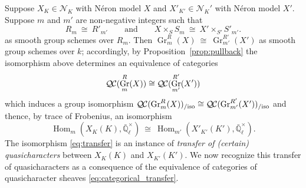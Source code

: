 \documentclass{amsart}
\theoremstyle{plain}
\theoremstyle{definition}
\theoremstyle{remark}
\newcommand{\EE}{\mathbb{\bar Q}_\ell}
\newcommand{\Fq}{k}
\newcommand{\EEx}{\EE^\times}
\DeclareMathOperator{\Hom}{Hom}
\DeclareMathOperator{\Gr}{Gr}
\newcommand{\iso}{{\ \cong\ }}
\newcommand{\QC}{{\mathcal{Q\hskip-0.8pt C}}}
\newcommand{\QCiso}[1]{\QC(#1)_{/\text{iso}}}
\begin{document}
Suppose $X_K\in \mathcal{N}_K$ with Néron model $X$ and $X'_{K'}\in \mathcal{N}_K'$ with Néron model $X'$.
Suppose $m$ and $m'$ are non-negative integers such that 
\begin{equation}\label{eq:schematic_transfer}
R_m \iso R'_{m'}
\qquad
\text{and}
\qquad
X \times_{S} S_m \iso X' \times_{S'} S'_{m'}.
\end{equation}
as smooth group schemes over $R_m$. 
Then
$
\Gr^R_m(X) \iso \Gr^{R'}_{m'}(X')
$
as smooth group schemes over $\Fq$; accordingly, by Proposition~\ref{prop:pullback} the isomorphism above determines an equivalence of categories
\begin{equation}\label{eq:categorical_transfer}
\QC(\Gr^R_m(X)) \cong \QC(\Gr^{R'}_{m'}(X'))
\end{equation}
which induces a group isomorphism
$
\QCiso{\Gr^R_m(X)} \cong \QCiso{\Gr^{R'}_{m'}(X')}
$
and thence, by trace of Frobenius, an isomorphism
\begin{equation}\label{eq:transfer}
\Hom_m(X_K(K),\EEx)  \iso  \Hom_{m'}(X'_{K'}(K'),\EEx).
\end{equation}
The isomorphism \eqref{eq:transfer} is an instance of {\it transfer of (certain) quasicharacters} between $X_K(K)$ and $X_{K'}(K')$. 
We now recognize this transfer of quasicharacters as a consequence of the equivalence of categories of quasicharacter sheaves \eqref{eq:categorical_transfer}.
\end{document}
